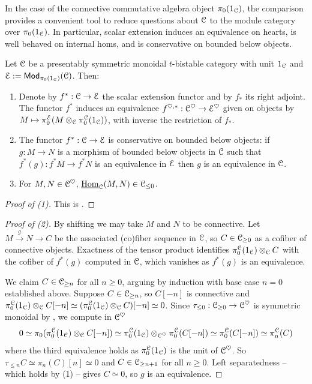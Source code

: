 In the case of the connective commutative algebra object $\pi_{0}(1_{\EuScript{C}})$, the comparison provides a convenient tool to reduce questions about $\EuScript{C}$ to the module category over $\pi_{0}(1_{\EuScript{C}})$. In particular, scalar extension induces an equivalence on hearts, is well behaved on internal homs, and is conservative on bounded below objects. 
\begin{proposition}\label{prop: relationship with heart}
    Let $\EuScript{C}$ be a presentably symmetric monoidal $t$-bistable category with unit $1_{\EuScript{C}}$ and $\EuScript{E}:=\mathsf{Mod}_{\pi_{0}(1_{\EuScript{C}})}(\EuScript{C})$. Then:
    \begin{enumerate}
        \item Denote by $f^{*}:\EuScript{C}\to\EuScript{E}$ the scalar extension functor and by $f_{*}$ its right adjoint. The functor $f^{*}$ induces an equivalence $f^{\heartsuit,*}:\EuScript{C}^{\heartsuit}\to\EuScript{E}^{\heartsuit}$ given on objects by $M\mapsto\pi_{0}^{\EuScript{E}}(M\otimes_{\EuScript{C}}\pi_{0}^{\EuScript{C}}(1_{\EuScript{C}}))$, with inverse the restriction of $f_{*}$. 
        \item The functor $f^{*}:\EuScript{C}\to\EuScript{E}$ is conservative on bounded below objects: if $g:M\to N$ is a morphism of bounded below objects in $\EuScript{C}$ such that $f^{*}(g):f^{*}M\to f^{*}N$ is an equivalence in $\EuScript{E}$ then $g$ is an equivalence in $\EuScript{C}$. 
        \item For $M,N\in\EuScript{C}^{\heartsuit}$, $\underline{\mathrm{Hom}}_{\EuScript{C}}(M,N)\in\EuScript{C}_{\leq0}$.
    \end{enumerate}
\end{proposition}
\begin{proof}[Proof of (1)]
    This is \cite[Lem. A.13 \& Prop. A.15 (3)]{CartierModules}. 
\end{proof}
\begin{proof}[Proof of (2)]
    By shifting we may take $M$ and $N$ to be connective. Let $M\xrightarrow{g}N\to C$ be the associated (co)fiber sequence in $\EuScript{C}$, so $C\in\EuScript{C}_{\geq0}$ as a cofiber of connective objects. Exactness of the tensor product identifies $\pi_{0}^{\EuScript{C}}(1_{\EuScript{C}})\otimes_{\EuScript{C}}C$ with the cofiber of $f^{*}(g)$ computed in $\EuScript{C}$, which vanishes as $f^{*}(g)$ is an equivalence. 

    We claim $C\in\EuScript{C}_{\geq n}$ for all $n\geq0$, arguing by induction with base case $n=0$ established above. Suppose $C\in\EuScript{C}_{\geq n}$, so $C[-n]$ is connective and $\pi_{0}^{\EuScript{C}}(1_{\EuScript{C}})\otimes_{\EuScript{C}}C[-n]\simeq(\pi_{0}^{\EuScript{C}}(1_{\EuScript{C}})\otimes_{\EuScript{C}}C)[-n]\simeq0$. Since $\tau_{\leq0}:\EuScript{C}_{\geq0}\to\EuScript{C}^{\heartsuit}$ is symmetric monoidal by , we compute in $\EuScript{C}^{\heartsuit}$
    $$0\simeq\pi_{0}(\pi_{0}^{\EuScript{C}}(1_{\EuScript{C}})\otimes_{\EuScript{C}}C[-n])\simeq\pi_{0}^{\EuScript{C}}(1_{\EuScript{C}})\otimes_{\EuScript{C}^{\heartsuit}}\pi_{0}^{\EuScript{C}}(C[-n])\simeq\pi_{0}^{\EuScript{C}}(C[-n])\simeq\pi_{n}^{\EuScript{C}}(C)$$
    where the third equivalence holds as $\pi_{0}^{\EuScript{C}}(1_{\EuScript{C}})$ is the unit of $\EuScript{C}^{\heartsuit}$. So $\tau_{\leq n}C\simeq\pi_{n}(C)[n]\simeq0$ and $C\in\EuScript{C}_{\geq n+1}$ for all $n\geq0$. Left separatedness -- which holds by  (1) -- gives $C\simeq0$, so $g$ is an equivalence.
\end{proof}
